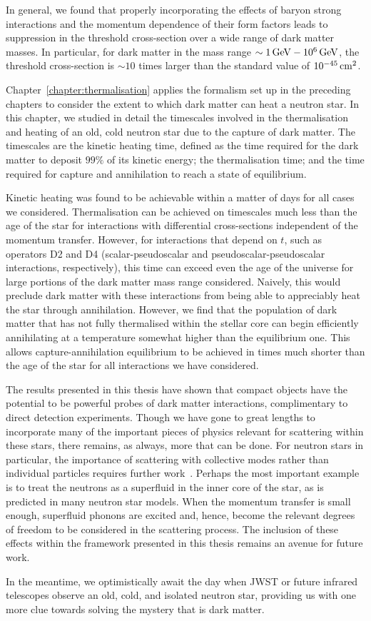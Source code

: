 In general, we found that properly incorporating the effects of baryon strong interactions and the momentum dependence of their form factors leads to suppression in the threshold cross-section over a wide range of dark matter masses. In particular, for dark matter in the mass range $\sim 1{\rm \,GeV}-10^6{\rm \,GeV}$, the threshold cross-section is $\sim 10$ times larger than the standard value of $10^{-45}{\rm \,cm}^2$. 

Chapter~\ref{chapter:thermalisation} applies the formalism set up in the preceding chapters to consider the extent to which dark matter can heat a neutron star. In this chapter, we studied in detail the timescales involved in the thermalisation and heating of an old, cold neutron star due to the capture of dark matter. The timescales are the kinetic heating time, defined as the time required for the dark matter to deposit $99\%$ of its kinetic energy; the thermalisation time; and the time required for capture and annihilation to reach a state of equilibrium. 

Kinetic heating was found to be achievable within a matter of days for all cases we considered. Thermalisation can be achieved on timescales much less than the age of the star for interactions with differential cross-sections independent of the momentum transfer. However, for interactions that depend on $t$, such as operators D2 and D4 (scalar-pseudoscalar and pseudoscalar-pseudoscalar interactions, respectively), this time can exceed even the age of the universe for large portions of the dark matter mass range considered. Naively, this would preclude dark matter with these interactions from being able to appreciably heat the star through annihilation.
However, we find that the population of dark matter that has not fully thermalised within the stellar core can begin efficiently annihilating at a temperature somewhat higher than the equilibrium one. This allows capture-annihilation equilibrium to be achieved in times much shorter than the age of the star for all interactions we have considered. 

The results presented in this thesis have shown that compact objects have the potential to be powerful probes of dark matter interactions, complimentary to direct detection experiments. Though we have gone to great lengths to incorporate many of the important pieces of physics relevant for scattering within these stars, there remains, as always, more that can be done. For neutron stars in particular, the importance of scattering with collective modes rather than individual particles requires further work~\cite{DeRocco}. Perhaps the most important example is to treat the neutrons as a superfluid in the inner core of the star, as is predicted in many neutron star models. When the momentum transfer is small enough, superfluid phonons are excited and, hence, become the relevant degrees of freedom to be considered in the scattering process. The inclusion of these effects within the framework presented in this thesis remains an avenue for future work. 

In the meantime, we optimistically await the day when JWST or future infrared telescopes observe an old, cold, and isolated neutron star, providing us with one more clue towards solving the mystery that is dark matter.